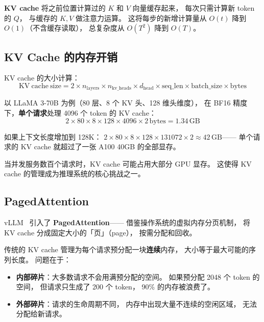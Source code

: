 \textbf{KV cache} 将之前位置计算过的 $K$ 和 $V$ 向量缓存起来，
每次只需计算新 token 的 $Q$，
与缓存的 $K, V$ 做注意力运算。
这将每步的新增计算量从 $O(t)$ 降到 $O(1)$（不含缓存读取），
总复杂度从 $O(T^2)$ 降到 $O(T)$。

\subsection{KV Cache 的内存开销}

KV cache 的大小计算：
\begin{equation}
  \mathrm{KV\ cache\ size} = 2 \times n_{\mathrm{layers}}
  \times n_{\mathrm{kv\_heads}} \times d_{\mathrm{head}}
  \times \mathrm{seq\_len} \times \mathrm{batch\_size}
  \times \mathrm{bytes}
\end{equation}

以 LLaMA 3-70B 为例（80 层、8 个 KV 头、128 维头维度），
在 BF16 精度下，\textbf{单个请求}处理 4096 个 token 的 KV cache：
\begin{equation}
  2 \times 80 \times 8 \times 128 \times 4096 \times 2\,\text{bytes}
  = 1.34\,\text{GB}
\end{equation}

如果上下文长度增加到 128K：
$2 \times 80 \times 8 \times 128 \times 131072 \times 2 \approx 42\,\text{GB}$——
单个请求的 KV cache 就超过了一张 A100 40GB 的全部显存。

当并发服务数百个请求时，KV cache 可能占用大部分 GPU 显存。
这使得 KV cache 的管理成为推理系统的核心挑战之一。

\subsection{PagedAttention}

vLLM~\cite{kwon2023vllm} 引入了 \textbf{PagedAttention}——
借鉴操作系统的虚拟内存分页机制，
将 KV cache 分成固定大小的「页」（page），
按需分配和回收。

传统的 KV cache 管理为每个请求预分配一块\textbf{连续}内存，
大小等于最大可能的序列长度。
问题在于：
\begin{itemize}[noitemsep]
  \item \textbf{内部碎片}：大多数请求不会用满预分配的空间。
        如果预分配 2048 个 token 的空间，
        但请求只生成了 200 个 token，
        90\% 的内存被浪费了。
  \item \textbf{外部碎片}：请求的生命周期不同，
        内存中出现大量不连续的空闲区域，
        无法分配给新请求。
\end{itemize}

